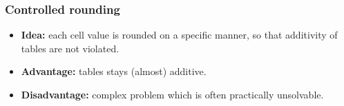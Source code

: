 \begin{frame}\frametitle{Controlled rounding}
	\begin{itemize}
		\item {\bf Idea:} each cell value is rounded on a specific manner, so that additivity of tables are not violated.\pause
		\item	{\bf Advantage:} tables stays (almost) additive. \pause
		\item	{\bf Disadvantage:} complex problem which is often practically unsolvable.
	\end{itemize}
\end{frame}


